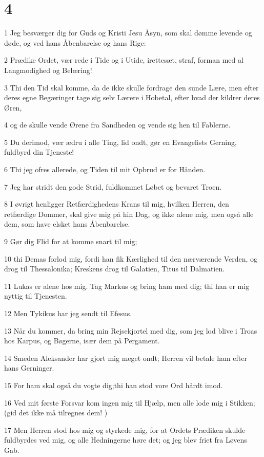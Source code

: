 \chapter{4}

\par 1 Jeg besværger dig for Guds og Kristi Jesu Åsyn, som skal dømme levende og døde, og ved hans Åbenbarelse og hans Rige:
\par 2 Prædike Ordet, vær rede i Tide og i Utide, irettesæt, straf, forman med al Langmodighed og Belæring!
\par 3 Thi den Tid skal komme, da de ikke skulle fordrage den sunde Lære, men efter deres egne Begæringer tage sig selv Lærere i Hobetal, efter hvad der kildrer deres Øren,
\par 4 og de skulle vende Ørene fra Sandheden og vende sig hen til Fablerne.
\par 5 Du derimod, vær ædru i alle Ting, lid ondt, gør en Evangelists Gerning, fuldbyrd din Tjeneste!
\par 6 Thi jeg ofres allerede, og Tiden til mit Opbrud er for Hånden.
\par 7 Jeg har stridt den gode Strid, fuldkommet Løbet og bevaret Troen.
\par 8 I øvrigt henligger Retfærdighedens Krans til mig, hvilken Herren, den retfærdige Dommer, skal give mig på hin Dag, og ikke alene mig, men også alle dem, som have elsket hans Åbenbarelse.
\par 9 Gør dig Flid for at komme snart til mig;
\par 10 thi Demas forlod mig, fordi han fik Kærlighed til den nærværende Verden, og drog til Thessalonika; Kreskens drog til Galatien, Titus til Dalmatien.
\par 11 Lukas er alene hos mig. Tag Markus og bring ham med dig; thi han er mig nyttig til Tjenesten.
\par 12 Men Tykikus har jeg sendt til Efesus.
\par 13 Når du kommer, da bring min Rejsekjortel med dig, som jeg lod blive i Troas hos Karpus, og Bøgerne, især dem på Pergament.
\par 14 Smeden Aleksander har gjort mig meget ondt; Herren vil betale ham efter hans Gerninger.
\par 15 For ham skal også du vogte dig;thi han stod vore Ord hårdt imod.
\par 16 Ved mit første Forsvar kom ingen mig til Hjælp, men alle lode mig i Stikken; (gid det ikke må tilregnes dem! )
\par 17 Men Herren stod hos mig og styrkede mig, for at Ordets Prædiken skulde fuldbyrdes ved mig, og alle Hedningerne høre det; og jeg blev friet fra Løvens Gab.
